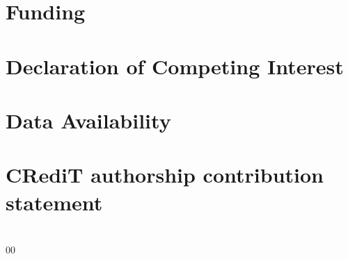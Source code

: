 \documentclass[preprint,12pt,authoryear]{elsarticle}
\begin{document}
\section*{Funding}

\section*{Declaration of Competing Interest}

\section*{Data Availability}

\section*{CRediT authorship contribution statement}

\appendix
\section{}
\label{app:1}

\subsection{}
\label{app:1.1}

\begin{thebibliography}{00}

\bibitem{}

\end{thebibliography}
\end{document}
